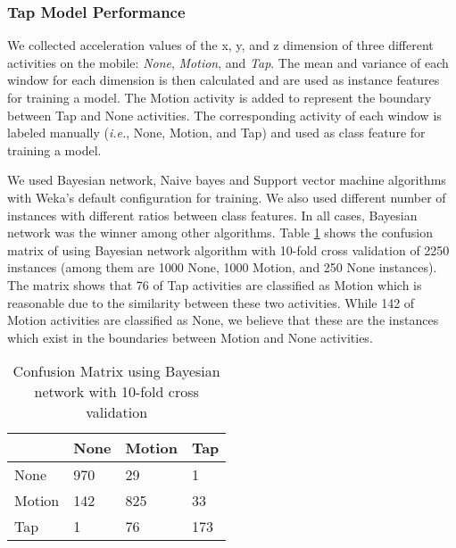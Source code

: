 \subsubsection{Tap Model Performance}
We collected acceleration values of the x, y, and z dimension of three different activities on the mobile: \emph{None}, \emph{Motion}, and \emph{Tap}. The mean and variance of each window for each dimension is then calculated and are used as instance features for training a model. The Motion activity is added to represent the boundary between Tap and None activities.  The corresponding activity of each window is labeled manually (\emph{i.e.}, None, Motion, and Tap) and used as class feature for training a model. 
\par
We used Bayesian network, Naive bayes and Support vector machine algorithms with Weka's default configuration for training. We also used different number of instances with different ratios between class features. In all cases, Bayesian network was the winner among other algorithms. Table \ref{tbl-Confusion Matrix} shows the confusion matrix of using Bayesian network algorithm with 10-fold cross validation of 2250 instances (among them are 1000 None, 1000 Motion, and 250 None instances). The matrix shows that 76 of Tap activities are classified as Motion which is reasonable due to the similarity between these two activities. While 142 of Motion activities are classified as None, we believe that these are the instances which exist in the boundaries between Motion and None activities.

\begin{table}[!t]
\begin{center}
\caption{Confusion Matrix using Bayesian network with 10-fold cross validation}
\label{tbl-Confusion Matrix}
\begin{tabular}{|l||l|l|l|}\hline
        & None   & Motion   & Tap   \\ \hline \hline
None    & 970    &	29      & 1	    \\
Motion  & 142    &	825     & 33    \\
Tap     & 1      &	76      & 173	\\ \hline
\end{tabular}
\end{center}
\end{table}






